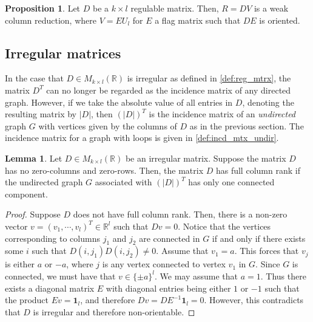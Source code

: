 \documentclass{article}
\theoremstyle{definition}
\newtheorem{remark}[theorem]{Remark}
\newtheorem{proposition}[theorem]{Proposition}
\newtheorem{lemma}[theorem]{Lemma}
\begin{document}
\begin{proposition}
\label{prop:regular}
    Let $D$ be a $k\times l$ regulable matrix. Then, $R=DV$ is a weak column reduction, where $V = EU_l$ for $E$ a flag matrix such that $DE$ is oriented. 
\end{proposition}

\subsection{Irregular matrices}\label{subsec:irreg_mtx}

In the case that $D\in M_{k\times l}(\mathbb{R})$ is irregular as defined in \cref{def:reg_mtrx},
the matrix $D^T$ can no longer be regarded as the incidence matrix of any directed graph. However, 
if we take the absolute value of all entries in $D$, denoting the resulting matrix by $|D|$,
then $\left(|D|\right)^T$ is the incidence matrix of an \emph{undirected} graph $G$ with vertices given by the columns of $D$ as in the previous section. The incidence matrix for a graph with loops is given in \cref{def:incd_mtx_undir}.

\begin{lemma}\label{lemma:no_ort_cmpt}
Let $D\in M_{k\times l}(\mathbb{R})$ be an irregular matrix.
Suppose the matrix $D$ has no zero-columns and zero-rows.
Then, the matrix $D$ has full column rank if the undirected graph $G$ associated with $\left(|D|\right)^T$ has only one connected component.
\end{lemma}

\begin{proof}
Suppose $D$ does not have full column rank. Then,
there is a non-zero vector $v=(v_1,\cdots, v_l)^T\in \mathbb{R}^l$ such that $Dv=0$. 
Notice that the vertices corresponding to columns  $j_1$ and $j_2$ are connected in $G$ if and only if there exists some $i$ such that $D(i,j_1)D(i,j_2) \neq 0$. 
Assume that $v_1=a$. This forces that $v_j$ is either $a$ or $-a$, where $j$ is any vertex connected to vertex $v_1$ in $G$. Since $G$ is connected, we must have that $v\in \{\pm a\}^l$. We may assume that $a=1$. 
Thus there exists a diagonal matrix $E$ with diagonal entries being either $1$ or $-1$ such that the product $Ev=\boldsymbol{1}_l$,
and therefore $Dv=DE^{-1}\boldsymbol{1}_l=0$.
However, this contradicts that $D$ is irregular and therefore non-orientable. 
\end{proof}
\end{document}
